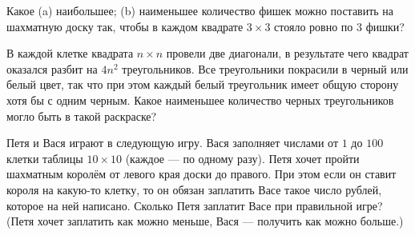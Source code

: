 \begin{problem}
	Какое (a) наибольшее; (b) наименьшее количество фишек можно поставить на шахматную доску так, чтобы в каждом квадрате $3 \times 3$ стояло ровно по $3$ фишки?
\end{problem}

\begin{problem}
	В каждой клетке квадрата $n \times n$ провели две диагонали, в результате чего квадрат оказался разбит на $4n^2$ треугольников. Все треугольники покрасили в черный или белый цвет, так что при этом каждый белый треугольник имеет общую сторону хотя бы с одним черным. Какое наименьшее количество черных треугольников могло быть в такой раскраске?
\end{problem}

\begin{problem}
	Петя и Вася играют в следующую игру. Вася заполняет числами от $1$ до $100$ клетки таблицы $10 \times 10$ (каждое --- по одному разу). Петя хочет пройти шахматным королём от левого края доски до правого. При этом если он ставит короля на какую-то клетку, то он обязан заплатить Васе такое число рублей, которое на ней написано. Сколько Петя заплатит Васе при правильной игре? (Петя хочет заплатить как можно меньше, Вася --- получить как можно больше.)
\end{problem}

